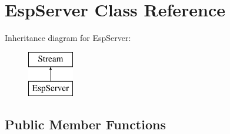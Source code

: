 \hypertarget{class_esp_server}{}\section{Esp\+Server Class Reference}
\label{class_esp_server}
Inheritance diagram for Esp\+Server\+:\begin{figure}[H]
\begin{center}
\leavevmode
\includegraphics[height=2.000000cm]{class_esp_server}
\end{center}
\end{figure}
\subsection*{Public Member Functions}
